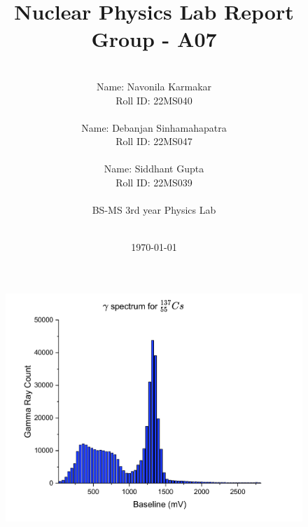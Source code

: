 \documentclass[a4paper]{article}
\theoremstyle{definition}
\begin{document}
\title{{\Huge \textbf{Nuclear Physics Lab Report}{\large\linebreak\\}}{\LARGE \textbf{Group - A07}\linebreak\linebreak}}

\author{\\Name: Navonila Karmakar\\
Roll ID: 22MS040\\
\\Name: Debanjan Sinhamahapatra\\
Roll ID: 22MS047\\
\\Name: Siddhant Gupta\\
Roll ID: 22MS039\\\\
BS-MS 3rd year Physics Lab\\\\
}

\date{\today}
\maketitle
\newpage


\begin{figure}[H]
    \centering
    \includegraphics[width=\textwidth]{PH3105_exp3.pdf}
\end{figure}
\end{document}
